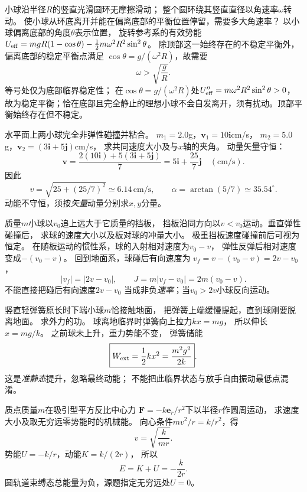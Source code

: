 \problemtext 小球沿半径$R$的竖直光滑圆环无摩擦滑动；
整个圆环绕其竖直直径以角速率$\omega$转动。
使小球从环底离开并能在偏离底部的平衡位置停留，需要多大角速率？
\workings
以小球偏离底部的角度$\theta$表示位置，
旋转参考系的有效势能
$U_{\rm eff}=mgR(1-\cos\theta)
-\tfrac12m\omega^2R^2\sin^2\theta$。
除顶部这一始终存在的不稳定平衡外，偏离底部的稳定平衡点满足
$\cos\theta=g/(\omega^2R)$，故需要
\[
\boxed{\omega>\sqrt{\frac gR}}.
\]
\crosscheck 等号处仅为底部临界稳定性；
在$\cos\theta=g/(\omega^2R)$处$U_{\rm eff}''=m\omega^2R^2\sin^2\theta>0$，故为稳定平衡；恰在底部且完全静止的理想小球不会自发离开，须有扰动。顶部平衡始终存在但不稳定。

\problemtext 水平面上两小球完全非弹性碰撞并粘合。
$m_1=2.0$g，$\bm v_1=10\bm i$cm/s，
$m_2=5.0$g，$\bm v_2=(3\bm i+5\bm j)$cm/s，
求共同速度大小及与$x$轴的夹角。
\workings
动量矢量守恒：
\[
\bm v=\frac{2(10\bm i)+5(3\bm i+5\bm j)}{7}
=5\bm i+\frac{25}{7}\bm j\quad(\mathrm{cm/s}).
\]
因此
\[
\boxed{v=\sqrt{25+(25/7)^2}\simeq6.14\,\mathrm{cm/s}},
\qquad
\boxed{\alpha=\arctan(5/7)\simeq35.54^\circ}.
\]
\crosscheck 动能不守恒，须按\emph{矢量}动量分别求$x,y$分量。

\problemtext 质量$m$小球以$v_0$追上远大于它质量的挡板，
挡板沿同方向以$v<v_0$运动。垂直弹性碰撞后，
求球的速度大小以及板对球的冲量大小。
\workings
极重挡板速度碰撞前后可视为恒定。
在随板运动的惯性系，球的入射相对速度为$v_0-v$，
弹性反弹后相对速度变成$-(v_0-v)$。
回到地面系，球碰后有向速度为
$v_f=v-(v_0-v)=2v-v_0$，
\[
\boxed{|v_f|=|2v-v_0|},\qquad
\boxed{J=m|v_f-v_0|=2m(v_0-v)}.
\]
\crosscheck 不能直接把碰后有向速度$2v-v_0$
当成非负\emph{速率}；当$v_0>2v$小球反向运动。

\problemtext 竖直轻弹簧原长时下端小球$m$恰接触地面，
把弹簧上端缓慢提起，直到球刚要脱离地面。
求外力的功。
\workings
球离地临界时弹簧向上拉力$kx=mg$，
所以伸长$x=mg/k$。
之前球未上升，重力势能不变，
弹簧储能
\[
\boxed{W_{\rm ext}=\frac12kx^2=\frac{m^2g^2}{2k}}.
\]
\crosscheck 这是\emph{准静态}提升，忽略最终动能；
不能把此临界状态与放手自由振动最低点混淆。

\problemtext 质点质量$m$在吸引型平方反比中心力
$\bm F=-k\bm e_r/r^2$下以半径$r$作圆周运动，
求速度大小及取无穷远零势能时的机械能。
\workings
向心条件$mv^2/r=k/r^2$，得
\[
\boxed{v=\sqrt{\frac{k}{mr}}}.
\]
势能$U=-k/r$，动能$K=k/(2r)$，
所以
\[
\boxed{E=K+U=-\frac{k}{2r}}.
\]
\crosscheck 圆轨道束缚态总能量为负，源题指定无穷远处$U=0$。

